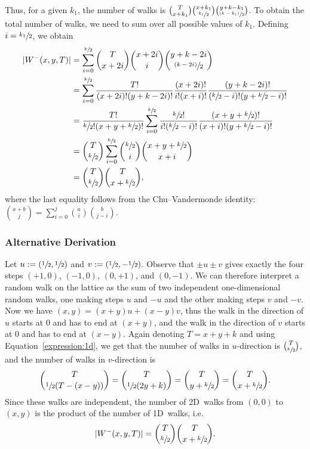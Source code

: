 \documentclass[11pt,a4paper,twoside,british]{article}
\begin{document}
Thus, for a given $k_1$, the number of walks is
$\binom{T}{x + k_1}\binom{x + k_1}{\sfrac{k_1}{2}}
\binom{y + k - k_1}{\sfrac{(k - k_1)}{2}}$.
To obtain the total number of walks, we need to sum over all possible values of
$k_1$.
Defining $i = \sfrac{k_1}{2}$, we obtain
\begin{align*}
\lvert W^-(x, y, T)\rvert
&= \sum_{i = 0}^{\sfrac{k}{2}} \binom{T}{x + 2i}\binom{x + 2i}{i}
\binom{y + k - 2i}{\sfrac{(k - 2i)}{2}}\\
&= \sum_{i = 0}^{\sfrac{k}{2}} \frac{T!}{(x + 2i)! (y + k - 2i)!}
\frac{(x + 2i)!}{i! (x + i)!}
\frac{(y + k - 2i)!}{(\sfrac{k}{2} - i)!(y + \sfrac{k}{2} - i)!}\\
&= \frac{T!}{\sfrac{k}{2}! (x + y + \sfrac{k}{2})!} \sum_{i = 0}^{\sfrac{k}{2}}
\frac{\sfrac{k}{2}!}{i! (\sfrac{k}{2} - i)!}
\frac{(x + y + \sfrac{k}{2})!}{(x + i)! (y + \sfrac{k}{2} - i)!}\\
&= \binom{T}{\sfrac{k}{2}} \sum_{i = 0}^{\sfrac{k}{2}} \binom{\sfrac{k}{2}}{i}
\binom{x + y + \sfrac{k}{2}}{x + i}\\
&= \binom{T}{\sfrac{k}{2}} \binom{T}{x + \sfrac{k}{2}},
\end{align*}
where the last equality follows from the Chu--Vandermonde identity:
$\binom{a + b}{j} = \sum_{i = 0}^j \binom{a}{i}\binom{b}{j - i}$.

\subsubsection{Alternative Derivation}
Let $u := (\sfrac{1}{2}, \sfrac{1}{2})$ and $v := (\sfrac{1}{2}, -\sfrac{1}{2})$.
Observe that $\pm u \pm v$ gives exactly the four steps $(+1, 0)$, $(-1, 0)$,
$(0, +1)$, and $(0, -1)$.
We can therefore interpret a random walk on the lattice as the sum of two
independent one-dimensional random walks, one making steps $u$ and $-u$ and the
other making steps $v$ and $-v$.
Now we have $(x, y) = (x + y)u + (x - y)v$, thus the walk in the direction of
$u$ starts at $0$ and has to end at $(x + y)$, and the walk in the direction of
$v$ starts at $0$ and has to end at $(x - y)$.
Again denoting $T = x + y + k$ and using Equation~\ref{expression:1d}, we get
that the number of walks in $u$-direction is $\binom{T}{\sfrac{k}{2}}$, and the
number of walks in $v$-direction is
\[\binom{T}{\sfrac{1}{2} (T - (x - y))} = \binom{T}{\sfrac{1}{2} (2y + k)} =
\binom{T}{y + \sfrac{k}{2}} = \binom{T}{x + \sfrac{k}{2}}.\]
Since these walks are independent, the number of 2D~walks from $(0, 0)$ to
$(x, y)$ is the product of the number of 1D~walks, i.e.\@
\begin{equation}
\lvert W^-(x, y, T)\rvert = \binom{T}{\sfrac{k}{2}} \binom{T}{x + \sfrac{k}{2}}.
\end{equation}
\end{document}
